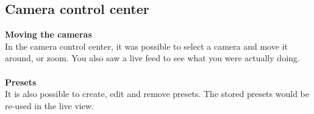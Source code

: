 \subsection*{Camera control center}
\textbf{Moving the cameras}\\
In the camera control center, it was possible to select a camera and move it around, or zoom. You also saw a live feed to see what you were actually doing.\\\\
\textbf{Presets}\\
It is also possible to create, edit and remove presets. The stored presets would be re-used in the live view.\\\\

